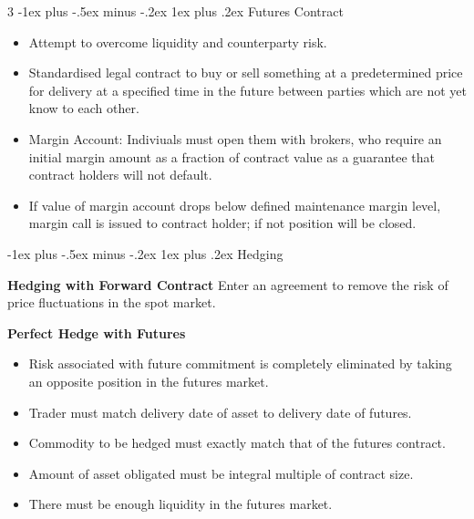\documentclass[10pt, landscape]{article}
\makeatletter
\renewcommand{\subsection}{\@startsection{subsection}{3}{0mm}%
                                {-1ex plus -.5ex minus -.2ex}%
                                {1ex plus .2ex}%
                                {\normalfont\small\bfseries}}%
\makeatother
\begin{document}
\begin{multicols*}{3}
\subsection{Futures Contract}
\begin{itemize}
    \item Attempt to overcome liquidity and counterparty risk.
    \item Standardised legal contract to buy or sell something at a predetermined price for delivery at a specified time in the future between parties which are not yet know to each other.
    \item Margin Account: Indiviuals must open them with brokers, who require an initial margin amount as a fraction of contract value as a guarantee that contract holders will not default.
    \item If value of margin account drops below defined maintenance margin level, margin call is issued to contract holder; if not position will be closed.
\end{itemize}

\subsection{Hedging}

\textbf{Hedging with Forward Contract} Enter an agreement to remove the risk of price fluctuations in the spot market.

\textbf{Perfect Hedge with Futures}
\begin{itemize}
    \item Risk associated with future commitment is completely eliminated by taking an opposite position in the futures market.
    \item Trader must match delivery date of asset to delivery date of futures.
    \item Commodity to be hedged must exactly match that of the futures contract.
    \item Amount of asset obligated must be integral multiple of contract size.
    \item There must be enough liquidity in the futures market.
\end{itemize}


\end{multicols*}
\end{document}
